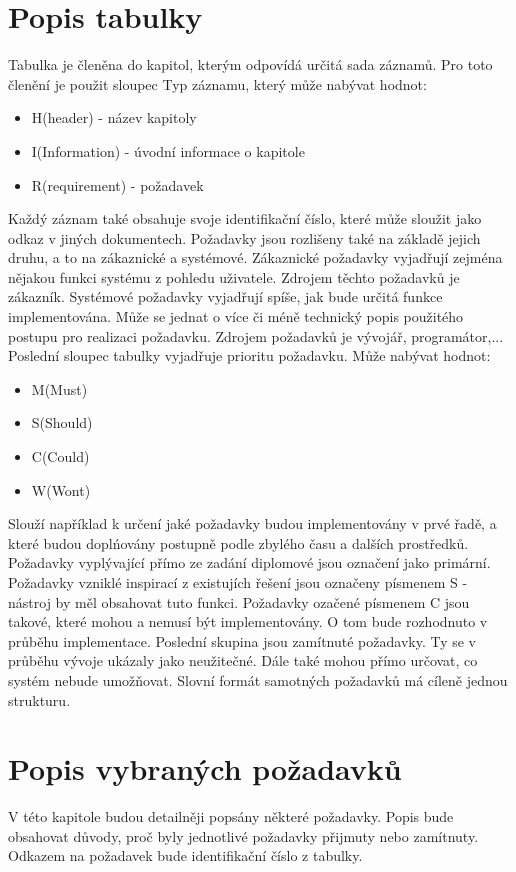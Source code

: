 \section{Popis tabulky}
Tabulka je členěna do kapitol, kterým odpovídá určitá sada záznamů. Pro toto členění je použit sloupec Typ záznamu, který může nabývat hodnot:
    \begin{itemize}
    \item H(header) - název kapitoly
	\item I(Information) - úvodní informace o kapitole
    \item R(requirement) - požadavek
\end{itemize}
Každý záznam také obsahuje svoje identifikační číslo, které může sloužit jako odkaz v jiných dokumentech. Požadavky jsou rozlišeny také na základě jejich druhu, a to na zákaznické a systémové. Zákaznické požadavky vyjadřují zejména nějakou funkci systému z pohledu uživatele. Zdrojem těchto požadavků je zákazník. Systémové požadavky vyjadřují spíše, jak bude určitá funkce implementována. Může se jednat o více či méně technický popis použitého postupu pro realizaci požadavku. Zdrojem požadavků je vývojář, programátor,... Poslední sloupec tabulky vyjadřuje prioritu požadavku. Může nabývat hodnot:
    \begin{itemize}
    \item M(Must)
	\item S(Should)
    \item  C(Could)
    \item  W(Wont)
    
\end{itemize}
Slouží například k určení jaké požadavky budou implementovány v prvé řadě, a které budou doplńovány postupně podle zbylého času a dalších prostředků. Požadavky vyplývající přímo ze zadání diplomové jsou označení jako primární. Požadavky vzniklé  inspirací z existujích řešení jsou označeny písmenem S - nástroj by měl obsahovat tuto funkci. Požadavky ozačené písmenem C jsou takové, které mohou a nemusí být implementovány. O tom bude rozhodnuto v průběhu implementace. Poslední skupina jsou zamítnuté požadavky. Ty se v průběhu vývoje ukázaly jako neužitečné. Dále také mohou přímo určovat, co systém nebude umožňovat. Slovní formát samotných požadavků má cíleně jednou strukturu.  

\section{Popis vybraných požadavků}
V této kapitole budou detailněji popsány některé požadavky. Popis bude obsahovat důvody, proč byly jednotlivé požadavky přijmuty nebo zamítnuty. Odkazem na požadavek bude identifikační číslo z tabulky. 
